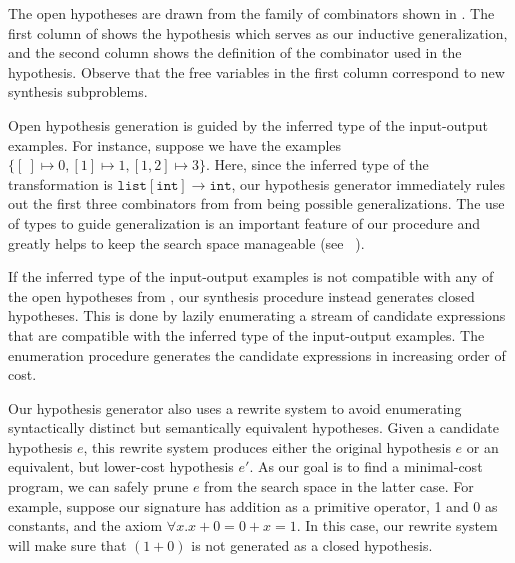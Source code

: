 The open hypotheses are drawn from the family of combinators shown in
. The first column of
 shows the hypothesis which serves as our
inductive generalization, and the second column shows the definition
of the combinator used in the hypothesis. Observe that the free
variables in the first column correspond to new 
synthesis subproblems.

Open hypothesis generation is guided by the inferred type of the
input-output examples. For instance, suppose we have the 
examples $\{ 
[\ ] \mapsto 0, [1] \mapsto 1, [1,2] \mapsto 3  \}$.
Here, since the inferred type of the transformation is $\mathtt{list}[
\mathtt{int}] \rightarrow \mathtt{int}$, our hypothesis generator
immediately rules out the first three combinators from
 from being possible
generalizations. The use of types to guide generalization is
an important feature of our procedure and greatly helps to keep the
search space manageable (see ~).


If the inferred type of the input-output examples is not compatible
with any of the open hypotheses from ,
our synthesis procedure instead generates closed hypotheses. This is done by lazily
enumerating a stream of candidate expressions %
that
are compatible with the inferred type of the input-output
examples. The enumeration procedure generates the candidate expressions in increasing
order of cost.

Our hypothesis generator also uses a rewrite system to avoid
enumerating syntactically distinct but semantically equivalent
hypotheses. Given a candidate hypothesis $e$, this rewrite system
produces either the original hypothesis $e$ or an equivalent, but
lower-cost hypothesis $e'$. As our goal is to find a minimal-cost
program, we can safely prune $e$ from the search space in the latter
case.
For example, suppose our signature has addition as a primitive operator, 1
and 0 as constants, and the axiom $\forall x. x + 0 = 0 + x = 1$. In
this case, our rewrite system will make sure that $(1 + 0)$ is not
generated as a closed hypothesis. 

